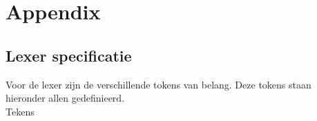 \chapter{Appendix} %
\label{cha:appendix}
\section{Lexer specificatie} %
\label{sec:lexer_specificatie}
Voor de lexer zijn de verschillende tokens van belang. Deze tokens staan hieronder allen gedefinieerd. \\ 

Tekens
\begin{description}
    \item {}      
    \item {}      \tab{:}
    \item {}  \tab{;}
    \item {}     \tab{(} 
    \item {}     \tab{)} 
    \item {}     \tab{[}
    \item {}     \tab{]}
    \item {}     \tab{\{}
    \item {}     \tab{\}}
    \item {}      \tab{,}
    \item {} 
    \item {} \tab{\textbackslash}
    \item {}       
    \item {}       
    \item {}        
\end{description}

\clearpage

